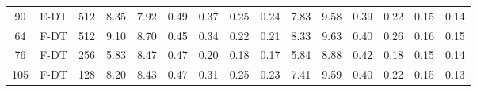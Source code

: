 \begin{table}
\begin{tabular}{@{\hskip3pt}c@{\hskip3pt}c@{\hskip3pt}c@{\hskip3pt}c@{\hskip3pt}c@{\hskip3pt}c@{\hskip3pt}c@{\hskip3pt}c@{\hskip3pt}c@{\hskip3pt}c@{\hskip3pt}c@{\hskip3pt}c@{\hskip3pt}c@{\hskip3pt}c@{\hskip3pt}c}
         90 &           E-DT &              512 &              8.35 &        7.92 &          0.49 &        0.37 &        0.25 &         0.24 &                7.83 &        9.58 &          0.39 &        0.22 &        0.15 &         0.14 \\
         64 &           F-DT &              512 &              9.10 &        8.70 &          0.45 &        0.34 &        0.22 &         0.21 &                8.33 &        9.63 &          0.40 &        0.26 &        0.16 &         0.15 \\
         76 &           F-DT &              256 &              5.83 &        8.47 &          0.47 &        0.20 &        0.18 &         0.17 &                5.84 &        8.88 &          0.42 &        0.18 &        0.15 &         0.14 \\
        105 &           F-DT &              128 &              8.20 &        8.43 &          0.47 &        0.31 &        0.25 &         0.23 &                7.41 &        9.59 &          0.40 &        0.22 &        0.15 &         0.13 \\
\bottomrule
\end{tabular}
\end{table}

